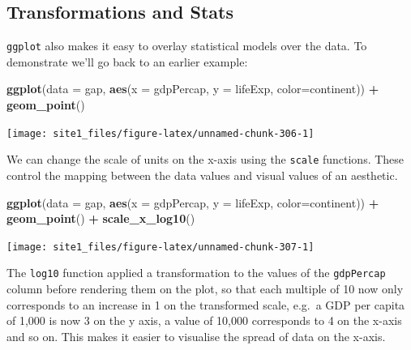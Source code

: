 \documentclass[]{book}
\newenvironment{Shaded}{\begin{snugshade}}{\end{snugshade}}
\newcommand{\DataTypeTok}[1]{\textcolor[rgb]{0.13,0.29,0.53}{#1}}
\newcommand{\KeywordTok}[1]{\textcolor[rgb]{0.13,0.29,0.53}{\textbf{#1}}}
\newcommand{\NormalTok}[1]{#1}
\newcommand{\OperatorTok}[1]{\textcolor[rgb]{0.81,0.36,0.00}{\textbf{#1}}}
\newcommand{\StringTok}[1]{\textcolor[rgb]{0.31,0.60,0.02}{#1}}
\begin{document}
\hypertarget{transformations-and-stats}{%
\subsection{Transformations and Stats}\label{transformations-and-stats}}

\texttt{ggplot} also makes it easy to overlay statistical models over the data. To demonstrate we'll go back to an earlier example:

\begin{Shaded}
\begin{Highlighting}[]
\KeywordTok{ggplot}\NormalTok{(}\DataTypeTok{data =}\NormalTok{ gap, }\KeywordTok{aes}\NormalTok{(}\DataTypeTok{x =}\NormalTok{ gdpPercap, }\DataTypeTok{y =}\NormalTok{ lifeExp, }\DataTypeTok{color=}\NormalTok{continent)) }\OperatorTok{+}\StringTok{ }
\StringTok{  }\KeywordTok{geom_point}\NormalTok{()}
\end{Highlighting}
\end{Shaded}

\begin{center}\texttt{[image: site1\_files/figure-latex/unnamed-chunk-306-1]} \end{center}

We can change the scale of units on the x-axis using the \texttt{scale} functions. These control the mapping between the data values and visual values of an aesthetic.

\begin{Shaded}
\begin{Highlighting}[]
\KeywordTok{ggplot}\NormalTok{(}\DataTypeTok{data =}\NormalTok{ gap, }\KeywordTok{aes}\NormalTok{(}\DataTypeTok{x =}\NormalTok{ gdpPercap, }\DataTypeTok{y =}\NormalTok{ lifeExp, }\DataTypeTok{color=}\NormalTok{continent)) }\OperatorTok{+}\StringTok{ }
\StringTok{  }\KeywordTok{geom_point}\NormalTok{() }\OperatorTok{+}\StringTok{ }
\StringTok{  }\KeywordTok{scale_x_log10}\NormalTok{()}
\end{Highlighting}
\end{Shaded}

\begin{center}\texttt{[image: site1\_files/figure-latex/unnamed-chunk-307-1]} \end{center}

The \texttt{log10} function applied a transformation to the values of the \texttt{gdpPercap} column before rendering them on the plot, so that each multiple of 10 now only corresponds to an increase in 1 on the transformed scale, e.g.~a GDP per capita of 1,000 is now 3 on the y axis, a value of 10,000 corresponds to 4 on the x-axis and so on. This makes it easier to visualise the spread of data on the x-axis.
\end{document}
